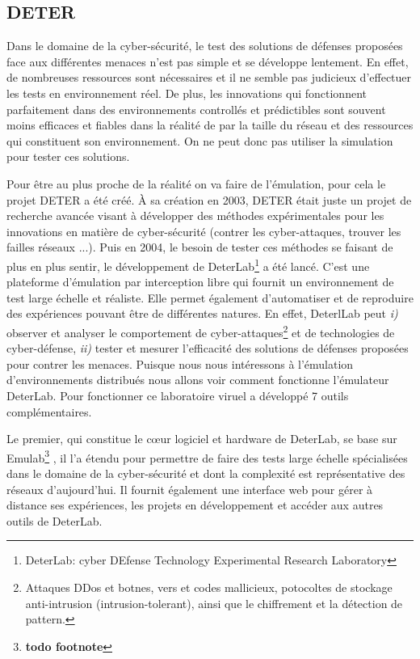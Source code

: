 \subsection{DETER}

Dans le domaine de la cyber-sécurité, le test des solutions de défenses
proposées face aux différentes menaces n'est pas simple et se développe
lentement. En effet, de nombreuses ressources sont nécessaires et il ne semble
pas judicieux d'effectuer les tests en environnement réel. De plus, les
innovations qui fonctionnent parfaitement dans des environnements controllés et
prédictibles sont souvent moins efficaces et fiables dans la réalité de par la
taille du réseau et des ressources qui constituent son environnement. On
ne peut donc pas utiliser la simulation pour tester ces solutions.

Pour être au plus proche de la réalité on va faire de l'émulation, pour cela le
projet DETER \citep{DETER_Project, DETER_benzel2011science,
  DETER_mirkovic2010deter} a été créé. À sa création en 2003, DETER était juste
un projet de recherche avancée visant à développer des méthodes expérimentales
pour les innovations en matière de cyber-sécurité (contrer les cyber-attaques,
trouver les failles réseaux ...). Puis en 2004, le besoin de tester ces méthodes
se faisant de plus en plus sentir, le développement de
DeterLab\footnote{DeterLab: cyber DEfense Technology Experimental Research
  Laboratory} a été lancé. C'est une plateforme d'émulation par interception
libre qui fournit un environnement de test large échelle et réaliste. Elle
permet également d'automatiser et de reproduire des expériences pouvant être de
différentes natures. En effet, DeterlLab peut \textit{i)} observer et analyser
le comportement de cyber-attaques\footnote{ Attaques DDos et botnes, vers et
  codes mallicieux, potocoltes de stockage anti-intrusion (intrusion-tolerant),
  ainsi que le chiffrement et la détection de pattern.} et de technologies de
cyber-défense, \textit{ii)} tester et mesurer l'efficacité des solutions de
défenses proposées pour contrer les menaces. Puisque nous nous intéressons à
l'émulation d'environnements distribués nous allons voir comment fonctionne
l'émulateur DeterLab. Pour fonctionner ce laboratoire viruel a développé 7
outils complémentaires.

Le premier, qui constitue le c\oe ur logiciel et hardware de DeterLab, se base sur
Emulab\footnote{\textbf{todo footnote}} \citep{EMULAB_INIT}, il l'a étendu pour permettre de faire
des tests large échelle spécialisées dans le domaine de la cyber-sécurité et
dont la complexité est représentative des réseaux d'aujourd'hui. Il fournit
également une interface web pour gérer à distance ses expériences, les projets
en développement et accéder aux autres outils de DeterLab.

